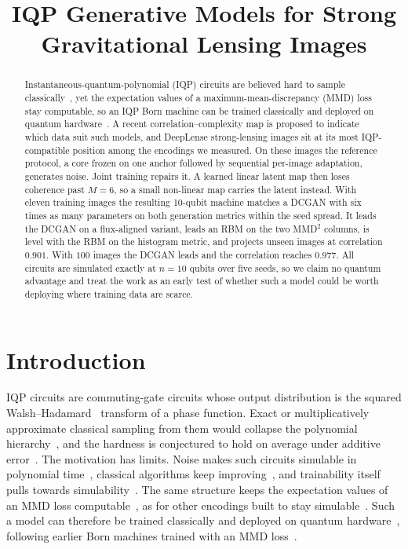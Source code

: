 \documentclass{article}
\title{IQP Generative Models for Strong Gravitational Lensing Images}
\author{}
\begin{document}
\maketitle

\begin{abstract}
Instantaneous-quantum-polynomial (IQP) circuits are believed hard to sample
classically~\cite{bremner_2011_classical,bremner_2016_average}, yet the expectation values of a
maximum-mean-discrepancy (MMD) loss stay computable, so an IQP Born machine can be trained
classically and deployed on quantum hardware~\cite{recio_2025_train}. A recent
correlation--complexity map is proposed to indicate which data suit such models, and DeepLense
strong-lensing images sit at its most IQP-compatible position among the encodings we measured. On
these images the reference protocol, a core frozen on one anchor followed by sequential per-image
adaptation, generates noise. Joint training repairs it. A learned linear latent map then loses
coherence past $M{=}6$, so a small non-linear map carries the latent instead. With eleven training
images the resulting 10-qubit machine matches a DCGAN with six times as many parameters on both
generation metrics within the seed spread. It leads the DCGAN on a flux-aligned variant, leads an RBM
on the two MMD$^2$ columns, is level with the RBM on the histogram metric, and projects unseen
images at correlation $0.901$. With $100$ images the DCGAN leads and the correlation reaches
$0.977$. All circuits are simulated exactly at $n=10$ qubits over five seeds, so we claim no
quantum advantage and treat the work as an early test of whether such a model could be worth
deploying where training data are scarce.
\end{abstract}

\section{Introduction}
\label{sec:intro}

IQP circuits are commuting-gate circuits whose output distribution is the squared
Walsh--Hadamard~\cite{walsh_1923_closed} transform of a phase function. Exact or multiplicatively
approximate classical sampling from them would collapse the polynomial
hierarchy~\cite{bremner_2011_classical}, and the hardness is conjectured to hold on average under
additive error~\cite{bremner_2016_average}. The motivation has limits. Noise makes such circuits
simulable in polynomial time~\cite{rajakumar_2024_polynomial}, classical algorithms keep
improving~\cite{maslov_2024_fast}, and trainability itself pulls towards
simulability~\cite{cerezo_2025_does}. The same structure keeps the expectation values of an MMD
loss computable~\cite{recio_2025_iqpopt}, as for other encodings built to stay
simulable~\cite{lizziobosco_2026_pauli}. Such a model can therefore be trained classically and
deployed on quantum hardware~\cite{recio_2025_train}, following earlier Born machines trained with
an MMD loss~\cite{liu_2018_differentiable,benedetti_2019_generative,coyle_2020_born}.
\end{document}
